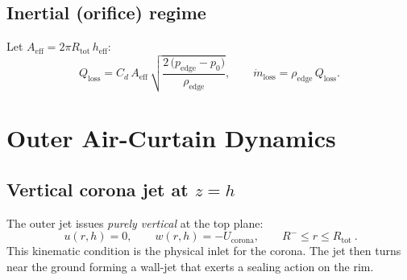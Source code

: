 \documentclass[11pt,a4paper]{article}
\begin{document}
\subsection*{Inertial (orifice) regime}
Let $A_{\mathrm{eff}}=2\pi R_{\text{tot}}\,h_{\mathrm{eff}}$:
\begin{equation}
  Q_{\mathrm{loss}}
  = C_d\,A_{\mathrm{eff}}\,\sqrt{\frac{2\,\big(p_\mathrm{edge}-p_0\big)}{\rho_\mathrm{edge}}},
  \qquad \dot m_{\mathrm{loss}}=\rho_\mathrm{edge}\,Q_{\mathrm{loss}}.
  \label{eq:qloss_orif}
\end{equation}

\section{Outer Air-Curtain Dynamics}
\subsection{Vertical corona jet at \texorpdfstring{$z=h$}{z=h}}
\label{subsec:vertical-jet}
The outer jet issues \emph{purely vertical} at the top plane:
\begin{equation}
  \boxed{ \ u(r,h)=0,\qquad w(r,h)=-U_{\mathrm{corona}},\qquad R^-\le r\le R_{\text{tot}} \ }.
  \label{eq:verticalBC}
\end{equation}
This kinematic condition is the physical inlet for the corona. The jet then turns near the ground forming a wall-jet that exerts a sealing action on the rim.
\end{document}
